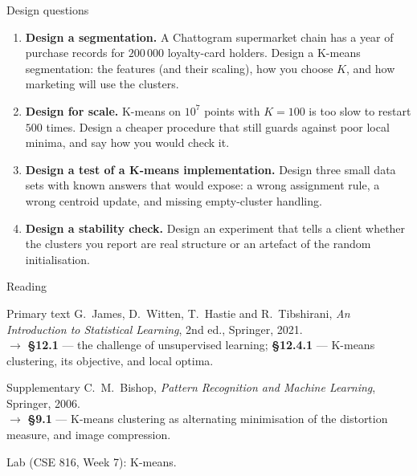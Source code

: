\documentclass[aspectratio=169,10pt]{beamer}
\begin{document}
\begin{frame}{Design questions}
  \footnotesize
  \begin{enumerate}
    \item \textbf{Design a segmentation.} A Chattogram supermarket chain has a year of
          purchase records for $200\,000$ loyalty-card holders. Design a K-means
          segmentation: the features (and their scaling), how you choose $K$, and how
          marketing will use the clusters. \hfill{}
    \item \textbf{Design for scale.} K-means on $10^7$ points with $K=100$ is too slow to
          restart $500$ times. Design a cheaper procedure that still guards against poor
          local minima, and say how you would check it. \hfill{}
    \item \textbf{Design a test of a K-means implementation.} Design three small data sets
          with known answers that would expose: a wrong assignment rule, a wrong centroid
          update, and missing empty-cluster handling. \hfill{}
    \item \textbf{Design a stability check.} Design an experiment that tells a client
          whether the clusters you report are real structure or an artefact of the random
          initialisation. \hfill{}
  \end{enumerate}
\end{frame}

\begin{frame}{Reading}
  \begin{block}{Primary text}
    G.~James, D.~Witten, T.~Hastie and R.~Tibshirani,
    \emph{An Introduction to Statistical Learning}, 2nd ed., Springer, 2021.\\[2pt]
    \hfill{\small$\rightarrow$ \textbf{\S12.1} --- the challenge of unsupervised learning;
    \textbf{\S12.4.1} --- K-means clustering, its objective, and local optima.}
  \end{block}
  \begin{block}{Supplementary}
    C.~M.~Bishop, \emph{Pattern Recognition and Machine Learning}, Springer, 2006.\\[2pt]
    \hfill{\small$\rightarrow$ \textbf{\S9.1} --- K-means clustering as alternating
    minimisation of the distortion measure, and image compression.}
  \end{block}
  \vspace{1mm}
  \begin{center}
    \small\color{cugray}
    Lab (CSE 816, Week 7): K-means.
  \end{center}
\end{frame}
\end{document}
